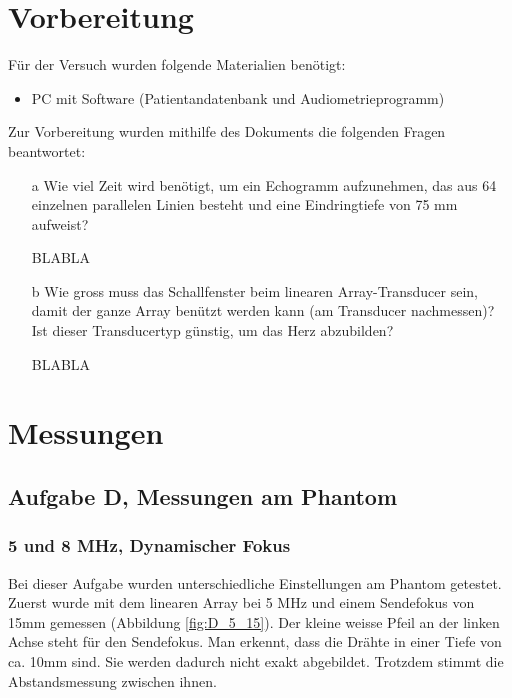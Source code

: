 \documentclass[11pt]{scrartcl}
\begin{document}

    \section{Vorbereitung}
   

    Für der Versuch wurden folgende Materialien benötigt:

    \begin{itemize}
        \item  PC mit Software (Patientandatenbank und Audiometrieprogramm)
        
    \end{itemize}

    Zur Vorbereitung wurden mithilfe des Dokuments \cite{QUELLEHIER} die folgenden Fragen beantwortet: %

    \begin{itemize}
        \item[a] Wie viel Zeit wird benötigt, um ein Echogramm aufzunehmen, das aus 64 einzelnen parallelen Linien besteht und eine Eindringtiefe von 75 mm aufweist?
        \item[]  BLABLA
        \item[b] Wie gross muss das Schallfenster beim linearen Array-Transducer sein, damit der ganze Array benützt werden kann (am Transducer nachmessen)?
                 Ist dieser Transducertyp günstig, um das Herz abzubilden?
        \item[]  BLABLA

    \end{itemize}

    \section{Messungen}

    \subsection{Aufgabe D, Messungen am Phantom}

    \subsubsection{5 und 8 MHz, Dynamischer Fokus}

    Bei dieser Aufgabe wurden unterschiedliche Einstellungen am Phantom getestet.
    Zuerst wurde mit dem linearen Array bei 5 MHz und einem Sendefokus von 15mm gemessen (Abbildung \ref{fig:D_5_15}).
    Der kleine weisse Pfeil an der linken Achse steht für den Sendefokus.
    Man erkennt, dass die Drähte in einer Tiefe von ca. 10mm sind.
    Sie werden dadurch nicht exakt abgebildet.
    Trotzdem stimmt die Abstandsmessung zwischen ihnen.
\end{document}
